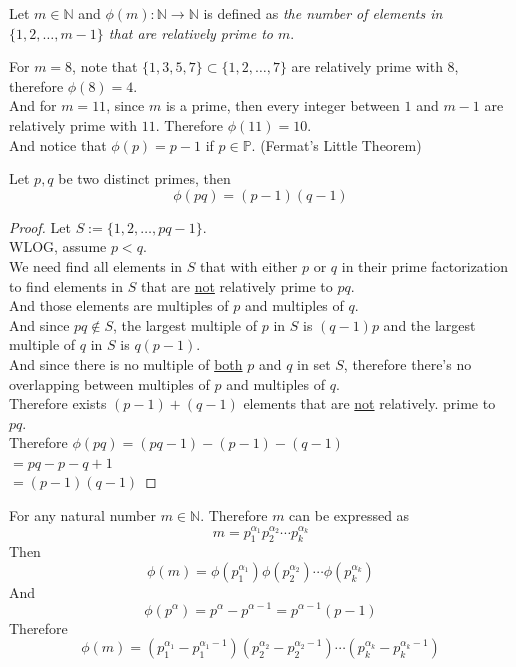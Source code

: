 \documentclass[10pt]{article}
\begin{document}
	\begin{definition} Let $m \in \mathbb{N}$ and $\phi(m): \mathbb{N} \to \mathbb{N}$ is defined as \emph{the number of elements in $\{1, 2, \dots, m-1\}$ that are relatively prime to $m$}.	
	\end{definition}
	
	\begin{example}
		For $m = 8$, note that $\{1, 3, 5, 7\} \subset \{1,2,\dots,7\}$ are relatively prime with 8, therefore $\phi(8) = 4$. \\
		And for $m=11$, since $m$ is a prime, then every integer between $1$ and $m-1$ are relatively prime with $11$. Therefore $\phi(11)=10$. \\
		And notice that $\phi(p) = p-1$ if $p \in \mathbb{P}$. (Fermat's Little Theorem)\\
	\end{example}
	
	\begin{proposition}
		Let $p, q$ be two distinct primes, then \[ \phi(pq) = (p-1)(q-1) \]
	\end{proposition}
	\begin{proof}
		Let $S:= \{1, 2, \dots, pq - 1\}$. \\
		WLOG, assume $p < q$. \\
		We need find all elements in $S$ that with either $p$ or $q$ in their prime factorization to find elements in $S$ that are \ul{not} relatively prime to $pq$. \\
		And those elements are multiples of $p$ and multiples of $q$. \\
		And since $pq \notin S$, the largest multiple of $p$ in $S$ is $(q-1)p$ and the largest multiple of $q$ in $S$ is $q(p-1)$. \\
		And since there is no multiple of \ul{both} $p$ and $q$ in set $S$, therefore there's no overlapping between multiples of $p$ and multiples of $q$.\\
		Therefore exists $(p-1)+(q-1)$ elements that are \ul{not} relatively. prime to $pq$. \\
		Therefore $\phi(pq) = (pq-1)-(p-1)-(q-1)$ \\
		$=pq-p-q+1$ \\
		$=(p-1)(q-1)$
	\end{proof}
	
	\begin{proposition}
		For any natural number $m \in \mathbb{N}$. Therefore $m$ can be expressed as 
		\[
			m = p_1^{\alpha_1} p_2^{\alpha_2} \cdots p_k^{\alpha_k}
		\]
		Then 
		\[
			\phi(m) = \phi(p_1^{\alpha_1}) \phi(p_2^{\alpha_2}) \cdots \phi(p_k^{\alpha_k})
		\]
		And 
		\[
			\phi(p^\alpha) = p^\alpha - p^{\alpha - 1}= p^{\alpha - 1} (p - 1)
		\]
		Therefore
		\[
			\phi(m) = (p_1^{\alpha_1} - p_1^{\alpha_1 - 1})(p_2^{\alpha_2} - p_2^{\alpha_2 - 1}) \cdots (p_k^{\alpha_k} - p_k^{\alpha_k - 1})
		\]
	\end{proposition}
	
\end{document}
